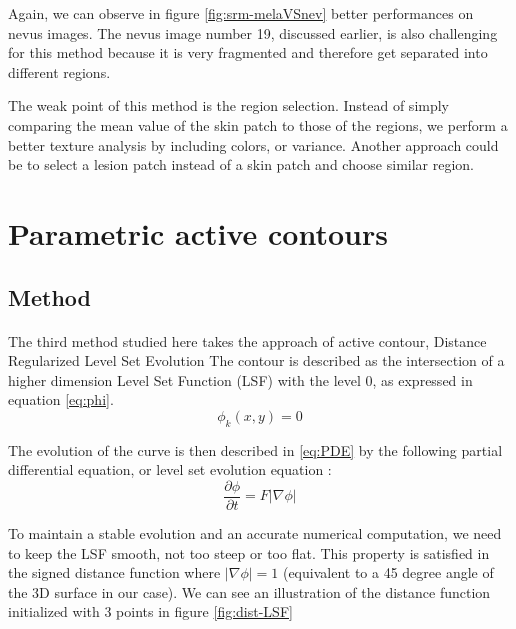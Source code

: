\documentclass[a4paper,10pt]{article}
\begin{document}
Again, we can observe in figure \ref{fig:srm-melaVSnev} better performances on nevus images. The nevus image number 19, discussed earlier, is also challenging for this method because it is very fragmented and therefore get separated into different regions.

The weak point of this method is the region selection. Instead of simply comparing the mean value of the skin patch to those of the regions, we perform a better texture analysis by including colors, or variance. Another approach could be to select a lesion patch instead of a skin patch and choose similar region. 

\section{Parametric active contours}
\subsection{Method}
\paragraph{} The third method studied here takes the approach of active contour,  Distance Regularized Level Set Evolution \cite{li2010distance} 
The contour is described as the intersection of a higher dimension Level Set Function (LSF) with the level 0, as expressed in equation \ref{eq:phi}.
\begin{equation}
\phi_k(x,y)=0
\label{eq:phi}
\end{equation}

The evolution of the curve is then described in \ref{eq:PDE} by the following partial differential equation, or level set evolution equation :
\begin{equation}
\frac{\partial \phi}{\partial t} = F|\nabla\phi|
\label{eq:PDE}
\end{equation}

To maintain a stable evolution and an accurate numerical computation, we need to keep the LSF smooth, not too steep or too flat. This property is satisfied in the signed distance function where $|\nabla\phi|=1$ (equivalent to a 45 degree angle of the 3D surface in our case). We can see an illustration of the distance function  initialized with 3 points in figure \ref{fig:dist-LSF}
\end{document}
